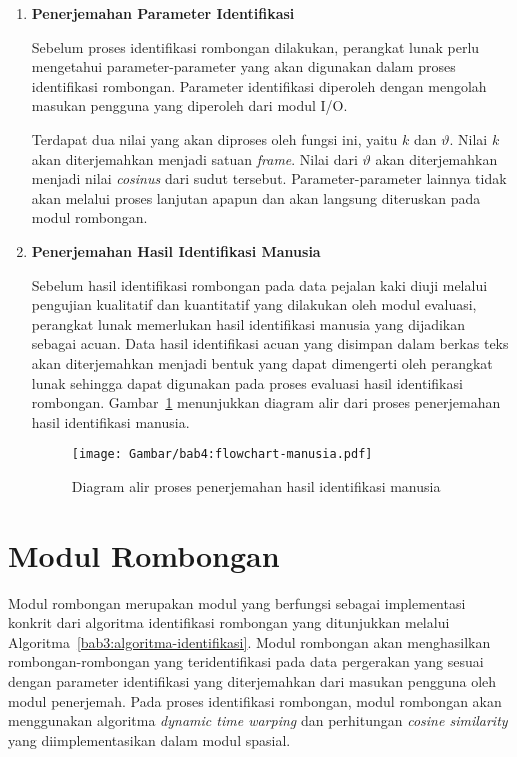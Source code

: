 \begin{enumerate}
    \item \textbf{Penerjemahan Parameter Identifikasi}
    
    Sebelum proses identifikasi rombongan dilakukan, perangkat lunak perlu mengetahui parameter-parameter yang akan digunakan dalam proses identifikasi rombongan. Parameter identifikasi diperoleh dengan mengolah masukan pengguna yang diperoleh dari modul I/O.
    
    Terdapat dua nilai yang akan diproses oleh fungsi ini, yaitu $k$ dan $\vartheta$. Nilai $k$ akan diterjemahkan menjadi satuan \textit{frame}. Nilai dari $\vartheta$ akan diterjemahkan menjadi nilai \textit{cosinus} dari sudut tersebut. Parameter-parameter lainnya tidak akan melalui proses lanjutan apapun dan akan langsung diteruskan pada modul rombongan.
    
    \item \textbf{Penerjemahan Hasil Identifikasi Manusia}
    
    Sebelum hasil identifikasi rombongan pada data pejalan kaki diuji melalui pengujian kualitatif dan kuantitatif yang dilakukan oleh modul evaluasi, perangkat lunak memerlukan hasil identifikasi manusia yang dijadikan sebagai acuan. Data hasil identifikasi acuan yang disimpan dalam berkas teks akan diterjemahkan menjadi bentuk yang dapat dimengerti oleh perangkat lunak sehingga dapat digunakan pada proses evaluasi hasil identifikasi rombongan. Gambar~\ref{bab4:flowchart-manusia} menunjukkan diagram alir dari proses penerjemahan hasil identifikasi manusia.
    
    \begin{figure}[htbp]
        \centering
        \texttt{[image: Gambar/bab4:flowchart-manusia.pdf]}
        \caption{Diagram alir proses penerjemahan hasil identifikasi manusia}
        \label{bab4:flowchart-manusia}
    \end{figure}
\end{enumerate}

\section{Modul Rombongan}
\label{sec:des-rombongan}

Modul rombongan merupakan modul yang berfungsi sebagai implementasi konkrit dari algoritma identifikasi rombongan yang ditunjukkan melalui Algoritma~\ref{bab3:algoritma-identifikasi}. Modul rombongan akan menghasilkan rombongan-rombongan yang teridentifikasi pada data pergerakan yang sesuai dengan parameter identifikasi yang diterjemahkan dari masukan pengguna oleh modul penerjemah. Pada proses identifikasi rombongan, modul rombongan akan menggunakan algoritma \textit{dynamic time warping} dan perhitungan \textit{cosine similarity} yang diimplementasikan dalam modul spasial.

